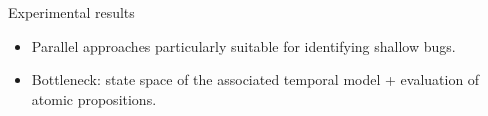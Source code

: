 \documentclass[10pt]{beamer}
\begin{document}
\begin{frame}{Experimental results}

\begin{tiny}

\end{tiny}

\begin{itemize}
	\item Parallel approaches particularly suitable for identifying
		\alert{shallow bugs}.
	\item \alert{Bottleneck}: state space of the associated temporal model +
		evaluation of atomic propositions.
\end{itemize}

\end{frame}

\end{document}
